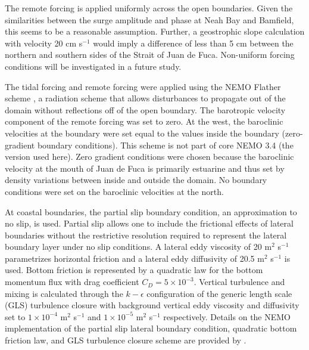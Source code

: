 \documentclass[letterpaper]{tATO2e}
\begin{document}
{\color{red} The remote forcing is applied uniformly across the open boundaries. Given the similarities between the surge amplitude and phase at Neah Bay and Bamfield, this seems to be a reasonable assumption. Further, a geostrophic slope calculation with velocity 20 cm s$^{-1}$ would imply a difference of less than 5 cm between the northern and southern sides of the Strait of Juan de Fuca. Non-uniform forcing conditions will be investigated in a future study.}

The tidal forcing and remote forcing were applied using the NEMO Flather scheme \citep{flather1994storm, madec2012nemo}, a radiation scheme that allows disturbances to propagate out of the domain without reflections off of the open boundary. The barotropic velocity component of the remote forcing was set to zero. At the west, the baroclinic velocities at the boundary were set equal to the values inside the boundary (zero-gradient boundary conditions).  This scheme is not part of core NEMO 3.4 (the version used here).  Zero gradient conditions were chosen because the baroclinic velocity at the mouth of Juan de Fuca is primarily estuarine and thus set by density variations between inside and outside the domain. {\color{red} No boundary conditions were set on the baroclinic velocities at the north.} 

At coastal boundaries, the partial slip boundary condition, an approximation to no slip, is used. Partial slip allows one to include the frictional effects of lateral boundaries without the restrictive resolution required to represent the lateral boundary layer under no slip conditions. A lateral eddy viscosity of 20 m$^2$ s$^{-1}$ parametrizes horizontal friction and a lateral eddy diffusivity of 20.5 m$^2$ s$^{-1}$ is used.  Bottom friction is represented by a quadratic law for the bottom momentum flux with drag coefficient $C_D = 5\times 10^{-3}$. Vertical turbulence and mixing is calculated through the $k-\epsilon$ configuration of the generic length scale (GLS) turbulence closure \citep{umlauf2003generic} with background vertical eddy viscosity and diffusivity set to $1\times10^{-4}$ m$^2$ s$^{-1}$ and $1\times10^{-5}$ m$^2$ s$^{-1}$ respectively. Details on the NEMO implementation of the partial slip lateral boundary condition, quadratic bottom friction law, and GLS turbulence closure scheme are provided by \citet{madec2012nemo}.
\end{document}
